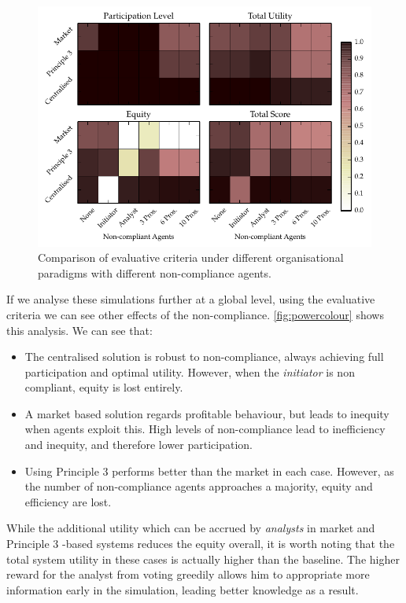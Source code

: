 \begin{figure}
\includegraphics{gfx/kc/powercolour.pdf} 
\caption{Comparison of evaluative criteria under different organisational paradigms with different non-compliance agents.}\label{fig:powercolour}
\end{figure}

If we analyse these simulations further at a global level, using the
evaluative criteria we can see other effects of the non-compliance.
\autoref{fig:powercolour} shows this analysis. We can see that:

\begin{itemize}
\item The centralised solution is robust to non-compliance, always achieving full participation and optimal utility. However, when the \emph{initiator} is non compliant, equity is lost entirely.
\item A market based solution regards profitable behaviour, but leads to inequity when agents exploit this. High levels of non-compliance lead to inefficiency and inequity, and therefore lower participation.
\item Using Principle 3 performs better than the market in each case. However, as the number of non-compliance agents approaches a majority, equity and efficiency are lost.
\end{itemize}

While the additional utility which can be accrued by \emph{analysts} in market
and Principle 3 -based systems reduces the equity overall, it is worth noting
that the total system utility in these cases is actually higher than the
baseline. The higher reward for the analyst from voting greedily allows him to
appropriate more information early in the simulation, leading better knowledge
as a result.

